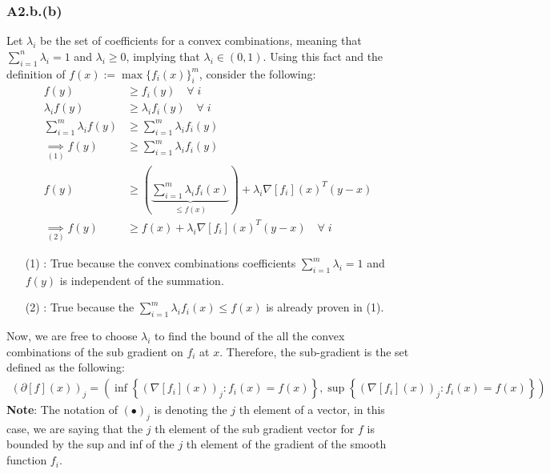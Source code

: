 \documentclass[]{article}
\begin{document}
        \subsubsection*{A2.b.(b)}
            Let $\lambda_i$ be the set of coefficients for a convex combinations, meaning that $\sum_{i = 1}^{n} \lambda_i = 1$ and $\lambda_i \ge 0$, implying that $\lambda_i \in (0, 1)$. Using this fact and the definition of $f(x):= \max\{f_i(x)\}_i^{m}$, consider the following:
            \begin{align*}\tag{A2.b.b.1}\label{eqn:A2.b.b.1}
                f(y) &\ge f_i(y) \quad \forall\; i
                \\
                \lambda_i f(y) &\ge \lambda_i f_i(y) \quad\forall\; i
                \\
                \sum_{i = 1}^{m}\lambda_i f(y) &\ge 
                \sum_{i = 1}^{m}\lambda_i f_i(y) 
                \\
                \underset{(1)}{\implies} f(y) &\ge \sum_{i = 1}^{m}\lambda_i f_i(y)
                \\
                f(y) &\ge \left(
                    \underbrace{\sum_{i = 1}^{m}\lambda_i f_i(x)}_{\le f(x)}
                \right) + \lambda_i \nabla[f_i](x)^T(y - x)
                \\
                \underset{(2)}{\implies} f(y) &\ge f(x) + \lambda_i \nabla[f_i](x)^T(y - x) \quad \forall \; i
            \end{align*}
            \begin{enumerate}
                \item[(1)]: True because the convex combinations coefficients $\sum_{i =1}^m \lambda_i = 1$ and $f(y)$ is independent of the summation. 
                \item[(2)]: True because the $\sum_{i = 1}^{m}\lambda_i f_i(x) \le f(x)$ is already proven in (1).  
            \end{enumerate}
            Now, we are free to choose $\lambda_i$ to find the bound of the all the convex combinations of the sub gradient on $f_i$ at $x$. Therefore, the sub-gradient is the set defined as the following: 
            \begin{align*}\tag{A2.b.b.2}\label{eqn:A2.b.b.2}
                (\partial[f](x))_j = \left(
                    \inf\left\lbrace
                        (\nabla[f_i](x))_j: f_i(x) = f(x)
                    \right\rbrace ,  
                    \sup\left\lbrace
                        (\nabla[f_i](x))_j: f_i(x) = f(x)
                    \right\rbrace
                \right)
            \end{align*}
            \textbf{Note}: The notation of $(\bullet)_j$ is denoting the $j$ th element of a vector, in this case, we are saying that the $j$ th element of the sub gradient vector for $f$ is bounded by the sup and inf of the $j$ th element of the gradient of the smooth function $f_i$. 
\end{document}
